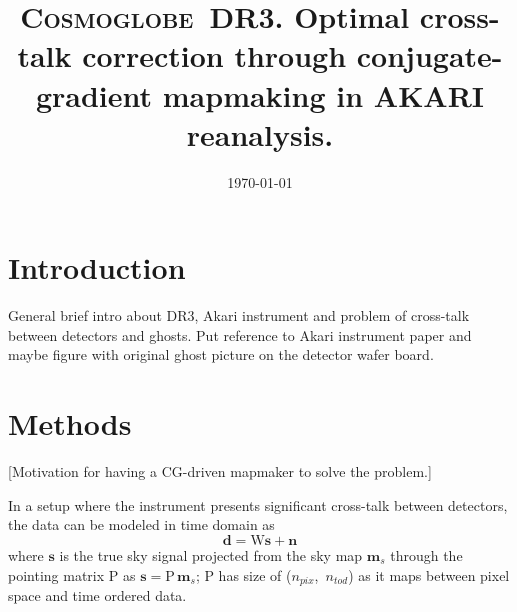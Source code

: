\documentclass{aa}
\def\Cosmoglobe{\textsc{Cosmoglobe}}
\begin{document}
 

   \title{\bfseries{\Cosmoglobe\ DR3. Optimal cross-talk correction through conjugate-gradient mapmaking in AKARI reanalysis.}}

   

   \titlerunning{\Cosmoglobe: AKARI reanalysis}

   \date{\today} 
   


   \maketitle

\setcounter{tocdepth}{2}
\tableofcontents
   
\section{Introduction}
General brief intro about DR3, Akari instrument and problem of cross-talk between detectors and ghosts.
Put reference to Akari instrument paper and maybe figure with original ghost picture on the detector wafer board. 

\section{Methods}
[Motivation for having a CG-driven mapmaker to solve the problem.]

In a setup where the instrument presents significant cross-talk between detectors, the data can be modeled in time domain as
\begin{equation}
	\textbf{d} = \mathrm{W}\textbf{s} + \textbf{n}
\end{equation}
where $\textbf{s}$ is the true sky signal projected from the sky map $\textbf{m}_s$ through the pointing matrix P as $\textbf{s} =
\mathrm{P}\, \textbf{m}_s$; 
P has size of ($n_{pix}$,~$n_{tod}$) as it maps between pixel space and time ordered data.
\end{document}
